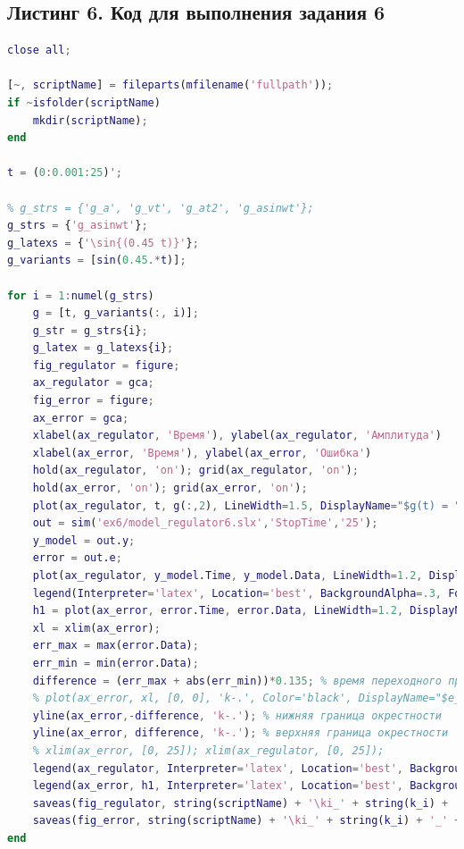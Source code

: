 \documentclass[a4paper]{article}
\begin{document}
\subsection*{Листинг 6. Код для выполнения задания 6}
\begin{lstlisting}[caption={Код для построения графиков для задания 6}, language=matlab]
% clear all;
close all;

[~, scriptName] = fileparts(mfilename('fullpath'));
if ~isfolder(scriptName)
    mkdir(scriptName);
end

t = (0:0.001:25)';

% g_strs = {'g_a', 'g_vt', 'g_at2', 'g_asinwt'};
g_strs = {'g_asinwt'};
g_latexs = {'\sin{(0.45 t)}'};
g_variants = [sin(0.45.*t)];

for i = 1:numel(g_strs)
    g = [t, g_variants(:, i)];
    g_str = g_strs{i};
    g_latex = g_latexs{i};
    fig_regulator = figure;
    ax_regulator = gca;
    fig_error = figure;
    ax_error = gca;
    xlabel(ax_regulator, 'Время'), ylabel(ax_regulator, 'Амплитуда')
    xlabel(ax_error, 'Время'), ylabel(ax_error, 'Ошибка')
    hold(ax_regulator, 'on'); grid(ax_regulator, 'on');
    hold(ax_error, 'on'); grid(ax_error, 'on');
    plot(ax_regulator, t, g(:,2), LineWidth=1.5, DisplayName="$g(t) = " + g_latex + "$", Color='black')
    out = sim('ex6/model_regulator6.slx','StopTime','25');
    y_model = out.y;
    error = out.e;
    plot(ax_regulator, y_model.Time, y_model.Data, LineWidth=1.2, DisplayName="$y_{zamk}(t), k_p = " + string(k_p) + "$")
    legend(Interpreter='latex', Location='best', BackgroundAlpha=.3, FontSize=10, FontName='Computer Modern')
    h1 = plot(ax_error, error.Time, error.Data, LineWidth=1.2, DisplayName="$e(t), k_p = " + string(k_p) + "$");
    xl = xlim(ax_error);
    err_max = max(error.Data);
    err_min = min(error.Data);
    difference = (err_max + abs(err_min))*0.135; % время переходного процесса до момента пока не будет погрешность 2%
    % plot(ax_error, xl, [0, 0], 'k-.', Color='black', DisplayName="$e_{end} = " + string(0) + "$");
    yline(ax_error,-difference, 'k-.'); % нижняя граница окрестности
    yline(ax_error, difference, 'k-.'); % верхняя граница окрестности
    % xlim(ax_error, [0, 25]); xlim(ax_regulator, [0, 25]); 
    legend(ax_regulator, Interpreter='latex', Location='best', BackgroundAlpha=.3, FontSize=12, FontName='Computer Modern')
    legend(ax_error, h1, Interpreter='latex', Location='best', BackgroundAlpha=.3, FontSize=12, FontName='Computer Modern')
    saveas(fig_regulator, string(scriptName) + '\ki_' + string(k_i) + '_' + g_str + '.eps', 'epsc')
    saveas(fig_error, string(scriptName) + '\ki_' + string(k_i) + '_' + g_str + '_error.eps', 'epsc')
end
\end{lstlisting}
\end{document}
